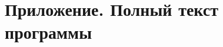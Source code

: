 \documentclass[a4paper]{article}
\begin{document}


\tableofcontents
\newpage


\clearpage
\section*{Приложение. Полный текст программы}

\inputminted[linenos]{c}{res/main.c}
\end{document}

